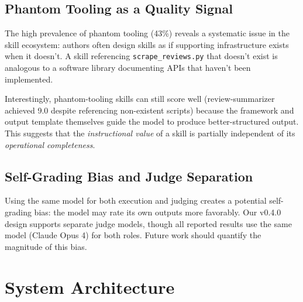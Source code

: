 \documentclass[11pt,a4paper]{article}
\begin{document}
\subsection{Phantom Tooling as a Quality Signal}

The high prevalence of phantom tooling (43\%) reveals a systematic issue in the skill ecosystem: authors often design skills as if supporting infrastructure exists when it doesn't. A skill referencing \texttt{scrape\_reviews.py} that doesn't exist is analogous to a software library documenting APIs that haven't been implemented.

Interestingly, phantom-tooling skills can still score well (review-summarizer achieved 9.0 despite referencing non-existent scripts) because the framework and output template themselves guide the model to produce better-structured output. This suggests that the \emph{instructional value} of a skill is partially independent of its \emph{operational completeness}.

\subsection{Self-Grading Bias and Judge Separation}

Using the same model for both execution and judging creates a potential self-grading bias: the model may rate its own outputs more favorably. Our v0.4.0 design supports separate judge models, though all reported results use the same model (Claude Opus 4) for both roles. Future work should quantify the magnitude of this bias.

\section{System Architecture}
\label{sec:architecture}
\end{document}
